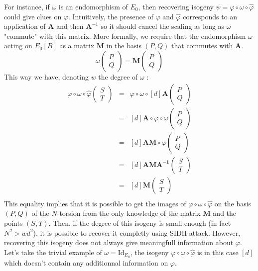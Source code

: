 \documentclass[11pt]{article}
\begin{document}
	For instance, if $\omega$ is an endomorphism of $E_0$,
	then recovering isogeny $\psi = \varphi \circ \omega \circ \widehat\varphi$
	could give clues on $\varphi$. Intuitively, the presence of $\varphi$ and
	$\widehat\varphi$ corresponds to an application of $\mathbf A$ and then $\mathbf A^{-1}$
	so it should cancel the scaling as long as $\omega$ "commute" with this matrix.
	More formally, we require that the endomorphism $\omega$ acting on $E_0[B]$ as a matrix
	 $\mathbf M$ in the basis $(P,Q)$ that commutes with $\mathbf A$.
\[
	\omega \begin{pmatrix} P \\ Q\end{pmatrix} = \mathbf M \begin{pmatrix} P \\ Q \end{pmatrix}
\] 
This way we have, denoting $w$ the degree of $\omega$ :
	\begin{eqnarray*}
		\varphi\circ\omega\circ\widehat\varphi \begin{pmatrix} S \\ T \end{pmatrix}
		&=& \varphi\circ\omega\circ [d]  \mathbf A \begin{pmatrix} P \\ Q \end{pmatrix} \\
		&=& [d]\mathbf A \circ \varphi\circ\omega \begin{pmatrix} P \\ Q \end{pmatrix} \\
		&=& [d]\mathbf{AM} \circ \varphi \begin{pmatrix} P \\ Q \end{pmatrix} \\
		&=& [d]\mathbf{AMA^{-1}}  \begin{pmatrix} S \\ T \end{pmatrix} \\
		&=& [d]\mathbf{M}  \begin{pmatrix} S \\ T \end{pmatrix} \\
	\end{eqnarray*}
	This equality implies that it is possible to get the images of $\varphi\circ\omega
	\circ\widehat\varphi$ on the basis $(P,Q)$ of the $N$-torsion from the only knowledge
	of the matrix $\mathbf M$ and the points $(S,T)$. Then, if the degree of this isogeny
	is small enough (in fact $N^2>wd^2$), it is possible to recover it completly using SIDH attack. 
	However, recovering this isogeny
	does not always give meaningfull information about $\varphi$. Let's take the trivial
	example of $\omega=\mathrm{Id}_{E_0}$, the isogeny $\varphi\circ\omega\circ\widehat\varphi$
	is in this case $[d]$ which doesn't contain any additionnal information on $\varphi$.
\end{document}
